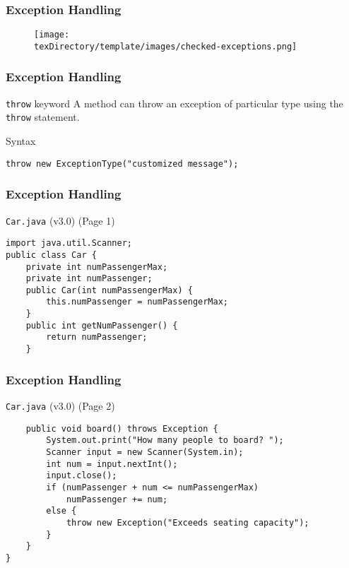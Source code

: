\documentclass[10pt, compress]{beamer}
\begin{document}
\begin{frame}[fragile]
	\frametitle{Exception Handling}
	\begin{figure}
		\texttt{[image: \\texDirectory/template/images/checked-exceptions.png]}
	\end{figure}
\end{frame}

\begin{frame}[fragile]
	\frametitle{Exception Handling}
	\begin{block}{\texttt{throw} keyword}
		A method can throw an exception of particular type using the \texttt{throw} statement.
	\end{block}
	\begin{block}{Syntax}
		\begin{verbatim}
throw new ExceptionType("customized message");
		\end{verbatim}
	\end{block}
\end{frame}

\begin{frame}[fragile]
	\frametitle{Exception Handling}
	\begin{block}{\texttt{Car.java} (v3.0) (Page 1)}
		\begin{verbatim}
import java.util.Scanner;
public class Car {
	private int numPassengerMax;
	private int numPassenger;
	public Car(int numPassengerMax) {
		this.numPassenger = numPassengerMax;
	}
	public int getNumPassenger() {
		return numPassenger;
	}
		\end{verbatim}
	\end{block}
\end{frame}

\begin{frame}[fragile]
	\frametitle{Exception Handling}
	\begin{block}{\texttt{Car.java} (v3.0) (Page 2)}
		\begin{verbatim}
	public void board() throws Exception {
		System.out.print("How many people to board? ");
		Scanner input = new Scanner(System.in);
		int num = input.nextInt();
		input.close();
		if (numPassenger + num <= numPassengerMax)
			numPassenger += num;
		else {
			throw new Exception("Exceeds seating capacity");
		}
	}
}
		\end{verbatim}
	\end{block}
\end{frame}
\end{document}
